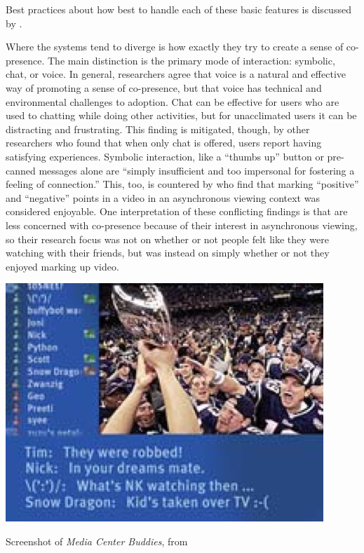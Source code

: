 Best practices about how best to handle each of these basic features is discussed by \citep{sociability.heuristics}.
	
Where the systems tend to diverge is how exactly they try to create a sense of co-presence. The main distinction is the primary mode of interaction: symbolic, chat, or voice. In general, researchers agree that voice is a natural and effective way of promoting a sense of co-presence, but that voice has technical and environmental challenges to adoption. Chat can be effective for users who are used to chatting while doing other activities, but for unacclimated users it can be distracting and frustrating. \citep{compare.voice.tex} This finding is mitigated, though, by other researchers who found that when only chat is offered, users report having satisfying experiences. \citep{regan2004media} Symbolic interaction, like a ``thumbs up'' button or pre-canned messages alone are ``simply insufficient and too impersonal for fostering a feeling of connection.'' \citep{examiningpresence} This, too, is countered by  who find that marking ``positive'' and ``negative'' points in a video in an asynchronous viewing context was considered enjoyable. One interpretation of these conflicting findings is that \citet{compare.voice.tex} are less concerned with co-presence because of their interest in asynchronous viewing, so their research focus was not on whether or not people felt like they were watching with their friends, but was instead on simply whether or not they enjoyed marking up video.


\begin{marginfigure}
	\includegraphics{figures/roar/media_center.png}
	\caption{Screenshot of \emph{Media Center Buddies}, from \citep{regan2004media}}
	\label{fig:media_center}
\end{marginfigure}


